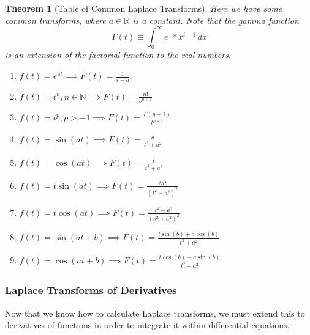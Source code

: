 \documentclass{article}
\newtheorem{theorem}{Theorem}[section]
\theoremstyle{remark}
\theoremstyle{definition}
\begin{document}
    \begin{theorem}[Table of Common Laplace Transforms]
    Here we have some common transforms, where $a \in \mathbb{R}$ is a constant. Note that the gamma function
    \[\Gamma(t) \equiv \int_{0}^\infty e^{-x} \, x^{t-1}\,dx\]
    is an extension of the factorial function to the real numbers. 
    \begin{enumerate}
        \item $f(t) = e^{a t} \implies F(t) = \frac{1}{s-a}$
        \item $f(t) = t^n, n \in \mathbb{N} \implies F(t) = \frac{n!}{s^{n+1}}$
        \item $f(t) = t^p, p > -1 \implies F(t) = \frac{\Gamma(p+1)}{t^{p+1}}$
        \item $f(t) = \sin(at) \implies F(t) = \frac{a}{t^2 + a^2}$
        \item $f(t) = \cos(at) \implies F(t) = \frac{t}{t^2 + a^2}$ 
        \item $f(t) = t \sin(at) \implies F(t) = \frac{2 a t}{(t^2 + a^2)^2}$
        \item $f(t) = t \cos(at) \implies F(t) = \frac{t^2 - a^2}{(s^2 + a^2)^2}$
        \item $f(t) = \sin(a t + b) \implies F(t) = \frac{t \sin(b) + a \cos(b)}{t^2 + a^2}$
        \item $f(t) = \cos(a t + b) \implies F(t) = \frac{t \cos(b) - a \sin(b)}{t^2 + a^2}$
    \end{enumerate}
    \end{theorem}

    \subsubsection{Laplace Transforms of Derivatives}

      Now that we know how to calculate Laplace transforms, we must extend this to derivatives of functions in order to integrate it within differential equations. 
\end{document}
